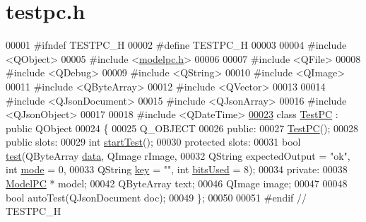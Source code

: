 \hypertarget{testpc_8h_source}{}\section{testpc.\+h}
\label{testpc_8h_source}

\begin{DoxyCode}
00001 \textcolor{preprocessor}{#ifndef TESTPC\_H}
00002 \textcolor{preprocessor}{#define TESTPC\_H}
00003 
00004 \textcolor{preprocessor}{#include <QObject>}
00005 \textcolor{preprocessor}{#include <\mbox{\hyperlink{modelpc_8h}{modelpc.h}}>}
00006 
00007 \textcolor{preprocessor}{#include <QFile>}
00008 \textcolor{preprocessor}{#include <QDebug>}
00009 \textcolor{preprocessor}{#include <QString>}
00010 \textcolor{preprocessor}{#include <QImage>}
00011 \textcolor{preprocessor}{#include <QByteArray>}
00012 \textcolor{preprocessor}{#include <QVector>}
00013 
00014 \textcolor{preprocessor}{#include <QJsonDocument>}
00015 \textcolor{preprocessor}{#include <QJsonArray>}
00016 \textcolor{preprocessor}{#include <QJsonObject>}
00017 
00018 \textcolor{preprocessor}{#include <QDateTime>}
\mbox{\hyperlink{class_test_p_c}{00023}} \textcolor{keyword}{class }\mbox{\hyperlink{class_test_p_c}{TestPC}} : \textcolor{keyword}{public} QObject
00024 \{
00025     Q\_OBJECT
00026 \textcolor{keyword}{public}:
00027     \mbox{\hyperlink{class_test_p_c_a65226eb54f1ff76639c9fb1e2013e430}{TestPC}}();
00028 \textcolor{keyword}{public} slots:
00029     \textcolor{keywordtype}{int} \mbox{\hyperlink{class_test_p_c_ad0d724439a65d183d3d336b667cb867b}{startTest}}();
00030 \textcolor{keyword}{protected} slots:
00031     \textcolor{keywordtype}{bool} \mbox{\hyperlink{class_test_p_c_a612a0409006417c6f03e1749bca0d45a}{test}}(QByteArray \mbox{\hyperlink{namespace_errors_dict_setup_af570460846fb9f0c91abd308a095dcdc}{data}}, QImage rImage,
00032               QString expectedOutput = \textcolor{stringliteral}{"ok"}, \textcolor{keywordtype}{int} \mbox{\hyperlink{namespacetests-setup_a04126d10edec6b3171e1b55a00309b23}{mode}} = 0,
00033               QString \mbox{\hyperlink{namespace_errors_dict_setup_a09c268098d09ffb8e5504f30fa6d5dd9}{key}} = \textcolor{stringliteral}{""}, \textcolor{keywordtype}{int} \mbox{\hyperlink{namespacetests-setup_a64974eb034f518d24195739395783d3d}{bitsUsed}} = 8);
00034 \textcolor{keyword}{private}:
00038     \mbox{\hyperlink{class_model_p_c}{ModelPC}} * model;
00042     QByteArray text;
00046     QImage image;
00047 
00048     \textcolor{keywordtype}{bool} autoTest(QJsonDocument doc);
00049 \};
00050 
00051 \textcolor{preprocessor}{#endif // TESTPC\_H}
\end{DoxyCode}

